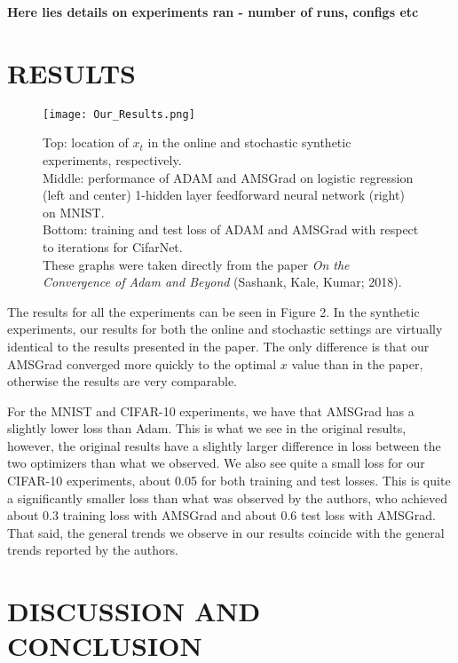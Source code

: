 \documentclass[letterpaper, 10 pt, conference]{ieeeconf}  %
\begin{document}
\textbf{Here lies details on experiments ran - number of runs, configs etc}

\section{RESULTS}

\begin{figure*}
\begin{minipage}{1\textwidth}
  \centering
  \texttt{[image: Our\_Results.png]}
  \label{fig:test2}
\end{minipage}%
\caption[]{Top: location of $x_t$ in the online and stochastic synthetic experiments, respectively. \\
Middle: performance of ADAM and AMSGrad on logistic regression (left and center) 1-hidden layer feedforward neural network (right) on MNIST.\\
Bottom: training and test loss of ADAM and AMSGrad with respect to iterations for CifarNet.\\
These graphs were taken directly from the paper \emph{On the Convergence of Adam and Beyond} (Sashank, Kale, Kumar; 2018).} 
\end{figure*}  

The results for all the experiments can be seen in Figure 2. In the synthetic experiments, our results for both the online and stochastic settings are virtually identical to the results presented in the paper. The only difference is that our AMSGrad converged more quickly to the optimal $x$ value than in the paper, otherwise the results are very comparable.

For the MNIST and CIFAR-10 experiments, we have that AMSGrad has a slightly lower loss than Adam. This is what we see in the original results, however, the original results have a slightly larger difference in loss between the two optimizers than what we observed. We also see quite a small loss for our CIFAR-10 experiments, about 0.05 for both training and test losses. This is quite a significantly smaller loss than what was observed by the authors, who achieved about 0.3 training loss with AMSGrad and about 0.6 test loss with AMSGrad. That said, the general trends we observe in our results coincide with the general trends reported by the authors. 

\section{DISCUSSION AND CONCLUSION}
\end{document}
